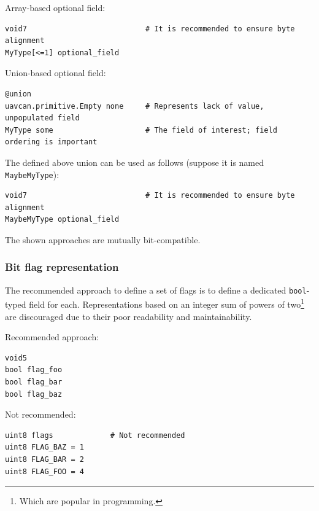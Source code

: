 \begin{remark}
Array-based optional field:
\begin{verbatim}
void7                           # It is recommended to ensure byte alignment
MyType[<=1] optional_field
\end{verbatim}
Union-based optional field:
\begin{verbatim}
@union
uavcan.primitive.Empty none     # Represents lack of value, unpopulated field
MyType some                     # The field of interest; field ordering is important
\end{verbatim}
The defined above union can be used as follows (suppose it is named \verb|MaybeMyType|):
\begin{verbatim}
void7                           # It is recommended to ensure byte alignment
MaybeMyType optional_field
\end{verbatim}
The shown approaches are mutually bit-compatible.
\end{remark}

\subsubsection{Bit flag representation}

The recommended approach to define a set of flags is to define a dedicated \verb|bool|-typed field for each.
Representations based on an integer sum of powers of two\footnote{Which are popular in programming.}
are discouraged due to their poor readability and maintainability.

\begin{remark}
Recommended approach:
\begin{verbatim}
void5
bool flag_foo
bool flag_bar
bool flag_baz
\end{verbatim}
Not recommended:
\begin{verbatim}
uint8 flags             # Not recommended
uint8 FLAG_BAZ = 1
uint8 FLAG_BAR = 2
uint8 FLAG_FOO = 4
\end{verbatim}
\end{remark}
